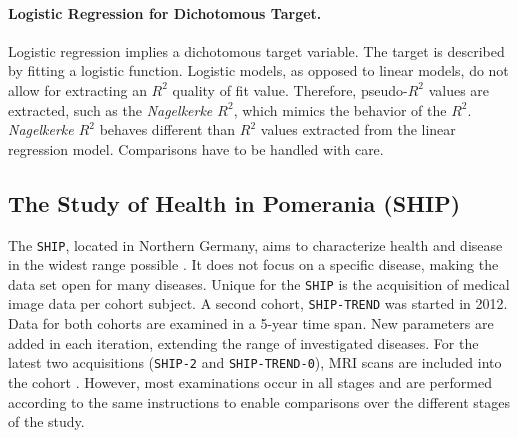 \documentclass[journal]{style/vgtc} 			          %
\begin{document}
\paragraph{Logistic Regression for Dichotomous Target.} Logistic regression implies a dichotomous target variable.
The target is described by fitting a logistic function.
Logistic models, as opposed to linear models, do not allow for extracting an $R^2$ quality of fit value.
Therefore, pseudo-$R^2$ values are extracted, such as the \emph{Nagelkerke $R^2$}, which mimics the behavior of the $R^2$.
\emph{Nagelkerke $R^2$} behaves different than $R^2$ values extracted from the linear regression model.
Comparisons have to be handled with care.
\subsection{The Study of Health in Pomerania (SHIP)}
The \texttt{SHIP}, located in Northern Germany, aims to characterize health and disease in the widest range possible \cite{Volzke2011}.
It does not focus on a specific disease, making the data set open for many diseases.
Unique for the \texttt{SHIP} is the acquisition of medical image data per cohort subject.
A second cohort, \texttt{SHIP-TREND} was started in 2012.
Data for both cohorts are examined in a 5-year time span.
New parameters are added in each iteration, extending the range of investigated diseases.
For the latest two acquisitions (\texttt{SHIP-2} and \texttt{SHIP-TREND-0}), MRI scans are included into the cohort \cite{Hegenscheid2009, Ivanovska2014}.
However, most examinations occur in all stages and are performed according to the same instructions to enable comparisons over the different stages of the study.
\end{document}
